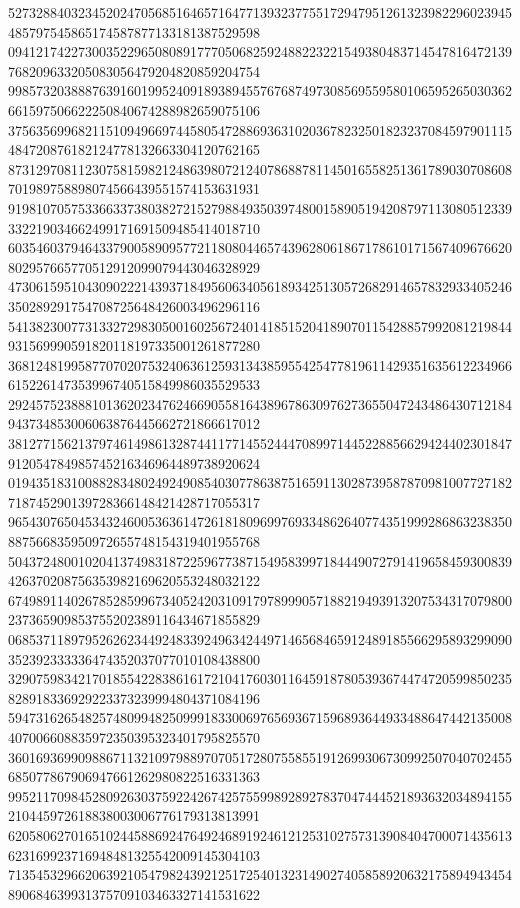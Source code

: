 \begin{DoxyCode}
      527328840323452024705685164657164771393237755172947951261323982296023945485797545865174587877133181387529598
      094121742273003522965080891777050682592488223221549380483714547816472139768209633205083056479204820859204754
      998573203888763916019952409189389455767687497308569559580106595265030362661597506622250840674288982659075106
      375635699682115109496697445805472886936310203678232501823237084597901115484720876182124778132663304120762165
      873129708112307581598212486398072124078688781145016558251361789030708608701989758898074566439551574153631931
      919810705753366337380382721527988493503974800158905194208797113080512339332219034662499171691509485414018710
      603546037946433790058909577211808044657439628061867178610171567409676620802957665770512912099079443046328929
      473061595104309022214393718495606340561893425130572682914657832933405246350289291754708725648426003496296116
      541382300773133272983050016025672401418515204189070115428857992081219844931569990591820118197335001261877280
      368124819958770702075324063612593134385955425477819611429351635612234966615226147353996740515849986035529533
      292457523888101362023476246690558164389678630976273655047243486430712184943734853006063876445662721866617012
      381277156213797461498613287441177145524447089971445228856629424402301847912054784985745216346964489738920624
      019435183100882834802492490854030778638751659113028739587870981007727182718745290139728366148421428717055317
      965430765045343246005363614726181809699769334862640774351999286863238350887566835950972655748154319401955768
      504372480010204137498318722596773871549583997184449072791419658459300839426370208756353982169620553248032122
      674989114026785285996734052420310917978999057188219493913207534317079800237365909853755202389116434671855829
      068537118979526262344924833924963424497146568465912489185566295893299090352392333336474352037077010108438800
      329075983421701855422838616172104176030116459187805393674474720599850235828918336929223373239994804371084196
      594731626548257480994825099918330069765693671596893644933488647442135008407006608835972350395323401795825570
      360169369909886711321097988970705172807558551912699306730992507040702455685077867906947661262980822516331363
      995211709845280926303759224267425755998928927837047444521893632034894155210445972618838003006776179313813991
      620580627016510244588692476492468919246121253102757313908404700071435613623169923716948481325542009145304103
      713545329662063921054798243921251725401323149027405858920632175894943454890684639931375709103463327141531622

\end{DoxyCode}
